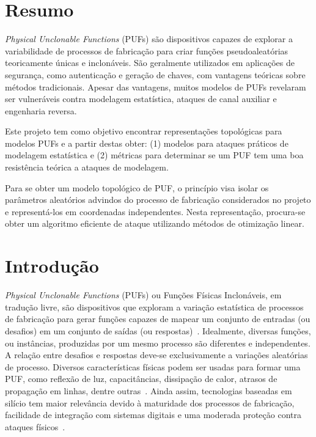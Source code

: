 \documentclass[pdftex,12pt]{article}
\begin{document}
\begin{spacing}{1.5}


\section*{Resumo}

\textit{Physical Unclonable Functions} (PUFs) são dispositivos capazes de explorar a variabilidade de processos de fabricação para criar funções pseudoaleatórias teoricamente únicas e inclonáveis. São geralmente utilizados em aplicações de segurança, como autenticação e geração de chaves, com vantagens teóricas sobre métodos tradicionais. Apesar das vantagens, muitos modelos de PUFs revelaram ser vulneráveis contra modelagem estatística, ataques de canal auxiliar e engenharia reversa. 

Este projeto tem como objetivo encontrar representações topológicas para modelos PUFs e a partir destas obter: (1) modelos para ataques práticos de modelagem estatística e (2) métricas para determinar se um PUF tem uma boa resistência teórica a ataques de modelagem. 

Para se obter um modelo topológico de PUF, o princípio visa isolar os parâmetros aleatórios advindos do processo de fabricação considerados no projeto e representá-los em coordenadas independentes. Nesta representação, procura-se obter um algoritmo eficiente de ataque utilizando métodos de otimização linear.

\section{Introdução}\label{sec:introducao}

\textit{Physical Unclonable Functions} (PUFs) ou Funções Físicas Inclonáveis, em tradução livre, são dispositivos que exploram a variação estatística de processos de fabricação para gerar funções capazes de mapear um conjunto de entradas (ou desafios) em um conjunto de saídas (ou respostas)~\cite{bookspringerlink:10.1007}. Idealmente, diversas funções, ou instâncias, produzidas por um mesmo processo são diferentes e independentes. A relação entre desafios e respostas deve-se exclusivamente a variações aleatórias de processo. Diversos características físicas podem ser usadas para formar uma PUF, como reflexão de luz, capacitâncias, dissipação de calor, atrasos de propagação em linhas, dentre outras~\cite{bookspringerlink:10.1007,RF-DNA}. Ainda assim, tecnologias baseadas em silício tem maior relevância devido à maturidade dos processos de fabricação, facilidade de integração com sistemas digitais e uma moderada proteção contra ataques físicos~\cite{MajzoobiKP09,RfidPUF}. 
    

\end{spacing}
\end{document}
